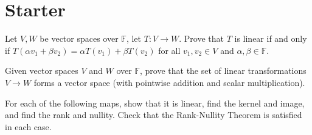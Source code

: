 \documentclass[answers]{exam}
\begin{document}
\section*{Starter}
\begin{questions}

\question%
Let $V, W$ be vector spaces over $\mathbb{F}$, let $T: V \to W$. Prove that $T$ is linear if and only if $T(\alpha v_{1}+\beta v_{2})=\alpha T(v_{1})+\beta T(v_{2})$ for all $v_{1}, v_{2} \in V$ and $\alpha, \beta \in \mathbb{F}$.



\question%
Given vector spaces $V$ and $W$ over $\mathbb{F}$, prove that the set of linear transformations $V \to W$ forms a vector space (with pointwise addition and scalar multiplication).



\question%
For each of the following maps, show that it is linear, find the kernel and image, and find the rank and nullity. Check that the Rank-Nullity Theorem is satisfied in each case.
\end{questions}
\end{document}
